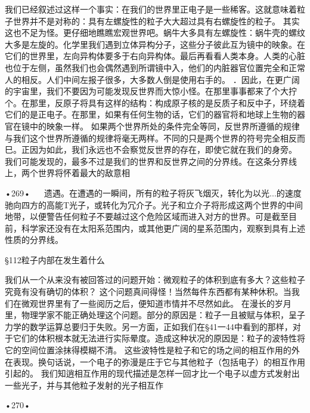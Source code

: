 我们已经叙述过这样一个事实：在我们的世界里正电子是一些稀客。这就意味着粒子世界并不是对称的：具有左螺旋性的粒子大大超过具有右螺旋性的粒子。
其实这也不足为怪。更仔细地瞧瞧宏观世界吧。蜗牛大多具有左螺旋性：蜗牛壳的螺纹大多是左旋的。化学里我们遇到立体异构分子，这些分子彼此互为镜中的映象。在它们的世界里，左向异构体要多于右向异构体。最后再看看人类本身。人类的心脏也位于左侧，虽然我们也会偶然遇到所谓镜中入，他们的内脏器官位置完全和正常人的相反。人们中间左报子很多，大多数人倒是使用右手的。
．因此，在更广阔的宇宙里，我们不要因为可能发现反世界而大惊小怪。在那里事事都来了个大拧个。在那里，反原子将具有这样的结构：构成原子核的是反质子和反中子，环绕着它们的是正电子。在那里，如果有任何生物的话，它们的器官将和地球上生物的器官在镜中的映象一样。
如果两个世界所处的条件完全等同，反世界所遵循的规律与我们这个世界所遵循的规律将毫无两样。不同的只是两个世界的符号完全相反而巳。正因为如此，我们永远也不会察觉反世界的存在，即使它就在我们的身旁。
我们可能发现的，最多不过是我们的世界和反世界之间的分界线。在这条分界线上，两个世界将怀着最大的敌意相

•269•
  
遗遇。在遭遇的一瞬间，所有的粒子将灰飞烟灭，转化为以光...的速度驰向四方的高能T光子，或转化为冗介子。光子和立介子将形成这两个世界的中间地带，以便警告任何粒子不要越过这个危险区域而进入对方的世界。可是截至目前，科学家还没有在太阳系范围内，或其他更广阔的星系范围内，观察到具有上述性质的分界线。

§112粒子内部在发生着什么

我们从一个从来没有被回答过的问题开始：微观粒子的体积到底有多大？这些粒子究竟有没有确切的体积？
这个问题真间得怪！当然每件东西都有某种休积。当我们在微观世界里有了一些阅历之后，便知道市情并不尽然如此。
在漫长的岁月里，物理学家不能正确处理这个问题。部分的原因是：粒子一且被赋与体积，呈子力学的数学运算总要归于失败。另一方面，正如我们在§41一44中看到的那样，对于它们的体积根本就无法进行实际晕度。造成这种状况的原因是：粒子的波特性将它的空间位置涂抹得模糊不清。
这些波特性是粒子和它的场之间的相互作用的外在表现。换句话说，一个电子的弥漫是庄于它与其他粒子（包括电子）的相互作用引起的。
我们知逍相互作用的现代描述是怎样一回才比一个电子以虚方式发射出一些光子，并与其他粒子发射的光子相互作

•270•

